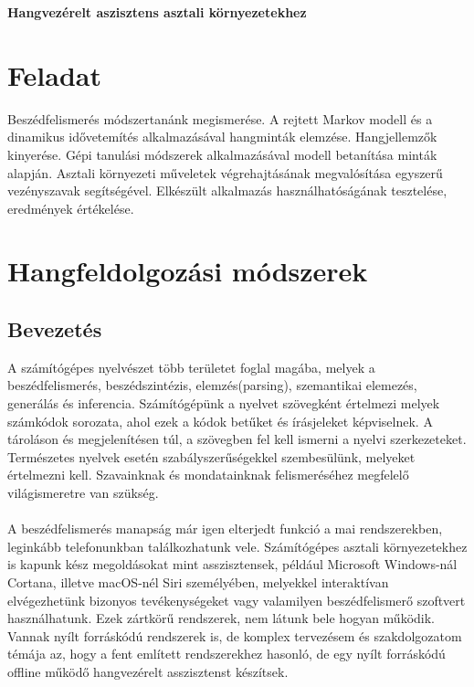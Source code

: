 \documentclass[a4paper,12pt]{paper}
\begin{document}
\begin{center}
   \large \textbf{Hangvezérelt aszisztens asztali környezetekhez}
\end{center}

\vskip 1cm

\section{Feladat}

Beszédfelismerés módszertanánk megismerése. A rejtett Markov modell és a dinamikus idővetemítés alkalmazásával hangminták elemzése. Hangjellemzők kinyerése. Gépi tanulási módszerek alkalmazásával modell betanítása minták alapján. Asztali környezeti műveletek végrehajtásának megvalósítása egyszerű vezényszavak segítségével. Elkészült alkalmazás használhatóságának tesztelése, eredmények értékelése.

\section{Hangfeldolgozási módszerek}

\subsection{Bevezetés}
A számítógépes nyelvészet több területet foglal magába, melyek a beszédfelismerés, beszédszintézis, elemzés(parsing), szemantikai elemezés, generálás és inferencia. Számítógépünk a nyelvet szövegként értelmezi melyek számkódok sorozata, ahol ezek a kódok betűket és írásjeleket képviselnek. A tároláson és megjelenítésen túl, a szövegben fel kell ismerni a nyelvi szerkezeteket. Természetes nyelvek esetén szabályszerűségekkel szembesülünk, melyeket értelmezni kell. Szavainknak és mondatainknak felismeréséhez megfelelő világismeretre van szükség.  \\\\A beszédfelismerés manapság már igen elterjedt funkció a mai rendszerekben, leginkább telefonunkban találkozhatunk vele. Számítógépes asztali környezetekhez is kapunk kész megoldásokat mint asszisztensek, például Microsoft Windows-nál Cortana, illetve macOS-nél Siri személyében, melyekkel interaktívan elvégezhetünk bizonyos tevékenységeket vagy valamilyen beszédfelismerő szoftvert használhatunk. Ezek zártkörű rendszerek, nem látunk bele hogyan működik. Vannak nyílt forráskódú rendszerek is, de komplex tervezésem és szakdolgozatom témája az, hogy a fent említett rendszerekhez hasonló, de egy nyílt forráskódú offline működő hangvezérelt asszisztenst készítsek. 
\end{document}
